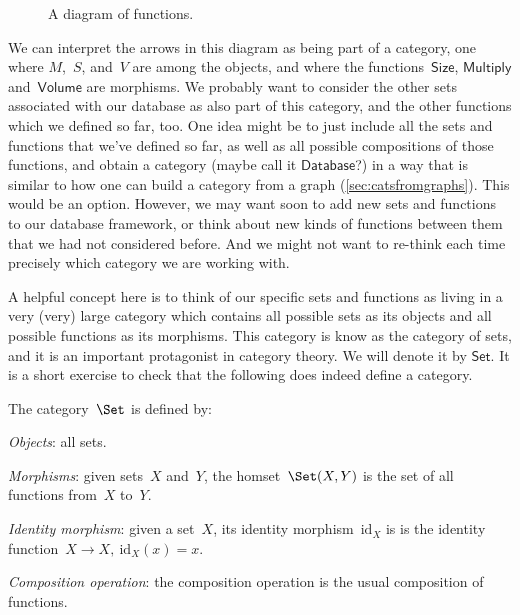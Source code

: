 \begin{figure}[h!]
\begin{center}
\end{center}
\caption{A diagram of functions. \label{fig:diagram_functions}}
\end{figure}

We can interpret the arrows in this diagram as being part of a category, one where $M$,~$S$, and~$V$ are among the objects, and where the functions~$\mathsf{Size}$, $\mathsf{Multiply}$ and~$\mathsf{Volume}$ are morphisms. We probably want to consider the other sets associated with our database as also part of this category, and the other functions which we defined so far, too. One idea might be to just include all the sets and functions that we've defined so far, as well as all possible compositions of those functions, and obtain a category (maybe call it $\mathsf{Database}$?) in a way that is similar to how one can build a category from a graph (\cref{sec:catsfromgraphs}). This would be an option. However, we may want soon to add new sets and functions to our database framework, or think about new kinds of functions between them that we had not considered before. And we might not want to re-think each time precisely which category we are working with.

A helpful concept here is to think of our specific sets and functions as living in a very (very) large category which contains all possible sets as its objects and all possible functions as its morphisms. This category is know as the category of sets, and it is an important protagonist in category theory. We will denote it by $\mathsf{Set}$. It is a short exercise to check that the following does indeed define a category. 

\begin{shaded}
\begin{definition}
The category~$\Set$ is defined by:
    \begin{compactenum}
    \item \emph{Objects}: all sets.
    \item \emph{Morphisms}: given sets~$X$ and~$Y$, the homset~$\Set(X,Y)$ is the set of all functions from~$X$ to~$Y$.
    \item \emph{Identity morphism}: given a set~$X$, its identity morphism~$\text{id}_X$ is
    is the identity function~$X \to X, \ \text{id}_X(x) = x$.
    \item \emph{Composition operation}: the composition operation is the usual composition of functions.
    \end{compactenum}
\end{definition}
\end{shaded}

